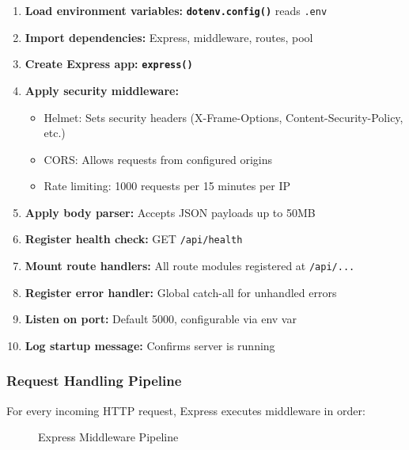 \documentclass[12pt,a4paper,oneside]{article}
\newcommand{\fileref}[1]{\texttt{#1}}
\newcommand{\funcname}[1]{\texttt{\textbf{#1}}}
\begin{document}
\begin{enumerate}
    \item \textbf{Load environment variables:} \funcname{dotenv.config()} reads \fileref{.env}
    \item \textbf{Import dependencies:} Express, middleware, routes, pool
    \item \textbf{Create Express app:} \funcname{express()}
    \item \textbf{Apply security middleware:}
    \begin{itemize}
        \item Helmet: Sets security headers (X-Frame-Options, Content-Security-Policy, etc.)
        \item CORS: Allows requests from configured origins
        \item Rate limiting: 1000 requests per 15 minutes per IP
    \end{itemize}
    \item \textbf{Apply body parser:} Accepts JSON payloads up to 50MB
    \item \textbf{Register health check:} GET \texttt{/api/health}
    \item \textbf{Mount route handlers:} All route modules registered at \texttt{/api/...}
    \item \textbf{Register error handler:} Global catch-all for unhandled errors
    \item \textbf{Listen on port:} Default 5000, configurable via env var
    \item \textbf{Log startup message:} Confirms server is running
\end{enumerate}

\subsubsection{Request Handling Pipeline}

For every incoming HTTP request, Express executes middleware in order:

\begin{figure}[H]
\centering
{}
\caption{Express Middleware Pipeline}
\label{fig:middleware-pipeline}
\end{figure}
\end{document}
